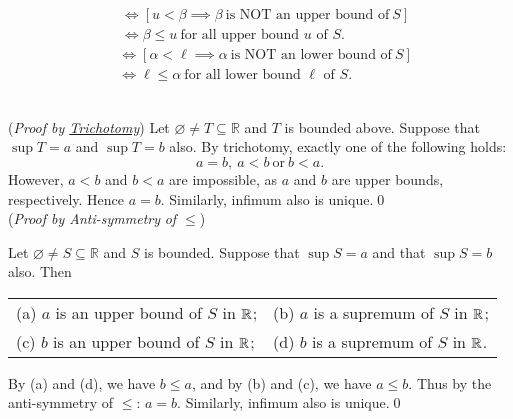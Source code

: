 \documentclass[11pt,openany]{article}
\begin{document}
\begin{remark*}
	\begin{align*}
		[u\ \text{is any upper bound of}\ S\implies \beta\leq u]&\iff [u<\beta\implies\beta\ \text{is NOT an upper bound of}\ S]\\
		&\iff \beta\leq u\ \text{for all upper bound $u$ of $S$}.
	\end{align*}
	\begin{align*}
		[\ell\ \text{is any lower bound of}\ S\implies \ell\leq\alpha]&\iff [\alpha<\ell\implies\alpha\ \text{is NOT an lower bound of}\ S]\\
		&\iff \ell\leq \alpha\ \text{for all lower bound $\ell$ of $S$}.
	\end{align*}
\end{remark*}
\begin{remark*}
	\ \vspace{12pt} \\
	(\textit{Proof by \hyperlink{trichotomy}{Trichotomy}}) Let $\varnothing\neq T\subseteq\mathbb{R}$ and $T$ is bounded above. Suppose that $\sup T=a$ and $\sup T=b$ also. By trichotomy, exactly one of the following holds: \[
	a=b,\ a<b\ \text{or}\ b<a.  
	\] However, $a<b$ and $b<a$ are impossible, as $a$ and $b$ are upper bounds, respectively. Hence $a=b$. Similarly, infimum also is unique.\qed\vspace{12pt} \\
	(\textit{Proof by Anti-symmetry}\footnotemark[3]\textit{ of $\leq$})
	\addtocounter{footnote}{1}
	Let $\varnothing\neq S\subseteq\mathbb{R}$ and $S$ is bounded. Suppose that $\sup S=a$ and that $\sup S=b$ also. Then \begin{center}
		\begin{tabular*}{\textwidth}{ll}
			(a) $a$ is an upper bound of $S$ in $\mathbb{R}$;
			& (b) $a$ is a supremum of $S$ in $\mathbb{R}$; \\
			(c) $b$ is an upper bound of $S$ in $\mathbb{R}$;
			& (d) $b$ is a supremum of $S$ in $\mathbb{R}$.
		\end{tabular*}
	\end{center} By (a) and (d), we have $b\leq a$, and by (b) and (c), we have $a\leq b$. Thus by the anti-symmetry of $\leq$: $a=b$. Similarly, infimum also is unique.\qed
\end{remark*}
\vfill
{}
\end{document}
